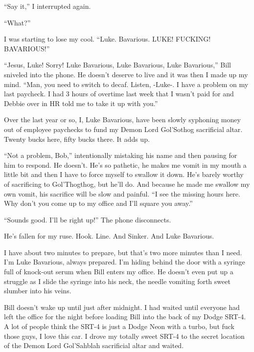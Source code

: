 ``Say it,'' I interrupted again.



``What?''



I was starting to lose my cool. ``Luke. Bavarious. LUKE! FUCKING!
BAVARIOUS!''



``Jesus, Luke! Sorry! Luke Bavarious, Luke Bavarious, Luke
Bavarious,'' Bill sniveled into the phone. He doesn't deserve to
live and it was then I made up my mind. ``Man, you need to switch to
decaf. Listen, -Luke-. I have a problem on my last paycheck. I had
3 hours of overtime last week that I wasn't paid for and Debbie
over in HR told me to take it up with you.''



Over the last year or so, I, Luke Bavarious, have been slowly
syphoning money out of employee paychecks to fund my Demon Lord
Gol'Sothog sacrificial altar. Twenty bucks here, fifty bucks there.
It adds up.



``Not a problem, Bob,'' intentionally mistaking his name and then
pausing for him to respond. He doesn't. He's so pathetic, he makes
me vomit in my mouth a little bit and then I have to force myself
to swallow it down. He's barely worthy of sacrificing to
Gol'Thogthog, but he'll do. And because he made me swallow my own
vomit, his sacrifice will be slow and painful. ``I see the missing
hours here. Why don't you come up to my office and I'll square you
away.''



``Sounds good. I'll be right up!'' The phone disconnects.



He's fallen for my ruse. Hook. Line. And Sinker. And Luke
Bavarious.



I have about two minutes to prepare, but that's two more minutes
than I need. I'm Luke Bavarious, always prepared. I'm hiding behind
the door with a syringe full of knock-out serum when Bill enters my
office. He doesn't even put up a struggle as I slide the syringe
into his neck, the needle vomiting forth sweet slumber into his
veins.



Bill doesn't wake up until just after midnight. I had waited until
everyone had left the office for the night before loading Bill into
the back of my Dodge SRT-4. A lot of people think the SRT-4 is just
a Dodge Neon with a turbo, but fuck those guys, I love this car. I
drove my totally sweet SRT-4 to the secret location of the Demon
Lord Gol'Sahblah sacrificial altar and waited.



